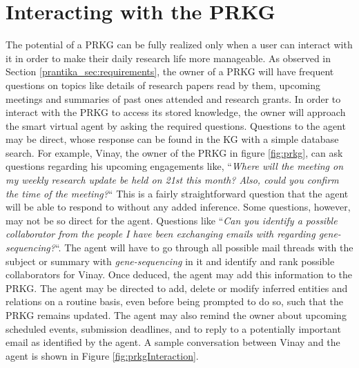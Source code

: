 \documentclass[11pt,pdftex]{article}
\begin{document}
\section{Interacting with the PRKG} \label{prantika_sec:interact}
The potential of a PRKG can be fully realized only when a user can interact with it in order to make their daily research life more manageable. As observed in Section \ref{prantika_sec:requirements}, the owner of a PRKG will have frequent questions on topics like details of research papers read by them, upcoming meetings and summaries of past ones attended and research grants. In order to interact with the PRKG to access its stored knowledge, the owner will approach the smart virtual agent by asking the required questions.
Questions to the agent may be direct, whose response can be found in the KG with a simple database search. For example, Vinay, the owner of the PRKG in figure \ref{fig:prkg}, can ask questions regarding his upcoming engagements like, ``\textit{Where will the meeting on my weekly research update be held on 21st this month? Also, could you confirm the time of the meeting?}`` This is a fairly straightforward question that the agent will be able to respond to without any added inference. Some questions, however, may not be so direct for the agent. Questions like ``\textit{Can you identify a possible collaborator from the people I have been exchanging emails with regarding gene-sequencing?}``. The agent will have to go through all possible mail threads with the subject or summary with \textit{gene-sequencing} in it and identify and rank possible collaborators for Vinay. Once deduced, the agent may add this information to the PRKG. The agent may be directed to add, delete or modify inferred entities and relations on a routine basis, even before being prompted to do so, such that the PRKG remains updated. The agent may also remind the owner about upcoming scheduled events, submission deadlines, and to reply to a potentially important email as identified by the agent. A sample conversation between Vinay and the agent is shown in Figure \ref{fig:prkgInteraction}.
\end{document}
